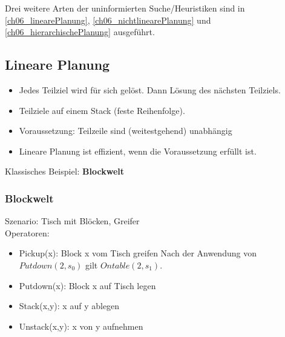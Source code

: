
Drei weitere Arten der uninformierten Suche/Heuristiken sind in \autoref{ch06_linearePlanung}, \autoref{ch06_nichtlinearePlanung} und \autoref{ch06_hierarchischePlanung} ausgeführt.
\subsection{Lineare Planung}
\label{ch06_linearePlanung}
\begin{itemize}
	\item Jedes Teilziel wird für sich gelöst.
	Dann Lösung des nächsten Teilziels.
	\item Teilziele auf einem Stack (feste Reihenfolge).
	\item Voraussetzung: Teilzeile sind (weitestgehend) unabhängig
	\item Lineare Planung ist effizient, wenn die Voraussetzung erfüllt ist.
\end{itemize}
Klassisches Beispiel: \textbf{Blockwelt}

\subsubsection{Blockwelt}
Szenario: Tisch mit Blöcken, Greifer\\
Operatoren:
\begin{itemize}
	\item Pickup(x): Block x vom Tisch greifen
	Nach der Anwendung von $Putdown(2,s_0)$ gilt $Ontable(2,s_1)$.
	\item Putdown(x): Block x auf Tisch legen
	\item Stack(x,y): x auf y ablegen
	\item Unstack(x,y): x von y aufnehmen
\end{itemize}


